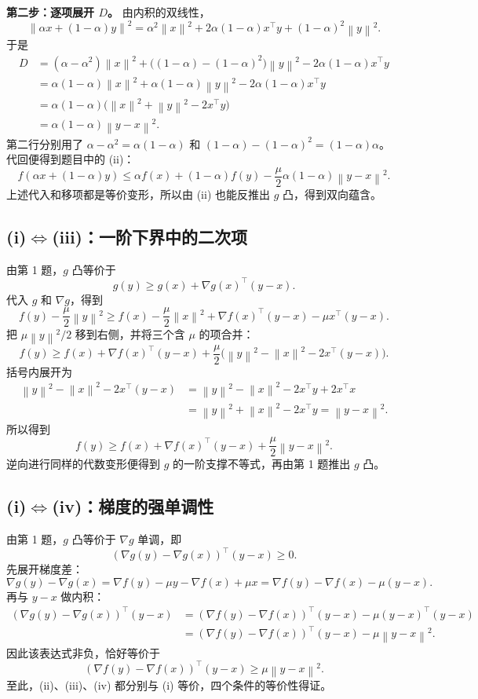 \documentclass[UTF8,a4paper,11pt,fontset=fandol]{ctexart}
\newcommand{\norm}[1]{\left\lVert#1\right\rVert}
\begin{document}
\textbf{第二步：逐项展开 $D$。}
由内积的双线性，
\[
 \norm{\alpha x+(1-\alpha)y}^2
 =\alpha^2\norm x^2+2\alpha(1-\alpha)x^\top y+(1-\alpha)^2\norm y^2.
\]
于是
\begin{align*}
 D&=(\alpha-\alpha^2)\norm x^2
   +\big((1-\alpha)-(1-\alpha)^2\big)\norm y^2
   -2\alpha(1-\alpha)x^\top y\\
 &=\alpha(1-\alpha)\norm x^2
   +\alpha(1-\alpha)\norm y^2-2\alpha(1-\alpha)x^\top y\\
 &=\alpha(1-\alpha)\big(\norm x^2+\norm y^2-2x^\top y\big)\\
 &=\alpha(1-\alpha)\norm{y-x}^2.
\end{align*}
第二行分别用了
$\alpha-\alpha^2=\alpha(1-\alpha)$ 和
$(1-\alpha)-(1-\alpha)^2=(1-\alpha)\alpha$。
代回便得到题目中的 (ii)：
\[
 \boxed{f(\alpha x+(1-\alpha)y)
 \leq\alpha f(x)+(1-\alpha)f(y)
 -\frac\mu2\alpha(1-\alpha)\norm{y-x}^2.}
\]
上述代入和移项都是等价变形，所以由 (ii) 也能反推出 $g$ 凸，得到双向蕴含。

\subsection*{(i)$\Leftrightarrow$(iii)：一阶下界中的二次项}
由第 1 题，$g$ 凸等价于
\[
 g(y)\geq g(x)+\nabla g(x)^\top(y-x).
\]
代入 $g$ 和 $\nabla g$，得到
\[
 f(y)-\frac\mu2\norm y^2
 \geq f(x)-\frac\mu2\norm x^2
 +\nabla f(x)^\top(y-x)-\mu x^\top(y-x).
\]
把 $\mu\norm y^2/2$ 移到右侧，并将三个含 $\mu$ 的项合并：
\[
 f(y)\geq f(x)+\nabla f(x)^\top(y-x)
 +\frac\mu2\big(\norm y^2-\norm x^2-2x^\top(y-x)\big).
\]
括号内展开为
\begin{align*}
 \norm y^2-\norm x^2-2x^\top(y-x)
 &=\norm y^2-\norm x^2-2x^\top y+2x^\top x\\
 &=\norm y^2+\norm x^2-2x^\top y
 =\norm{y-x}^2.
\end{align*}
所以得到
\[
 \boxed{f(y)\geq f(x)+\nabla f(x)^\top(y-x)+\frac\mu2\norm{y-x}^2.}
\]
逆向进行同样的代数变形便得到 $g$ 的一阶支撑不等式，再由第 1 题推出 $g$ 凸。

\subsection*{(i)$\Leftrightarrow$(iv)：梯度的强单调性}
由第 1 题，$g$ 凸等价于 $\nabla g$ 单调，即
\[
 (\nabla g(y)-\nabla g(x))^\top(y-x)\geq0.
\]
先展开梯度差：
\[
 \nabla g(y)-\nabla g(x)
 =\nabla f(y)-\mu y-\nabla f(x)+\mu x
 =\nabla f(y)-\nabla f(x)-\mu(y-x).
\]
再与 $y-x$ 做内积：
\begin{align*}
 (\nabla g(y)-\nabla g(x))^\top(y-x)
 &=(\nabla f(y)-\nabla f(x))^\top(y-x)
   -\mu(y-x)^\top(y-x)\\
 &=(\nabla f(y)-\nabla f(x))^\top(y-x)-\mu\norm{y-x}^2.
\end{align*}
因此该表达式非负，恰好等价于
\[
 \boxed{(\nabla f(y)-\nabla f(x))^\top(y-x)\geq\mu\norm{y-x}^2.}
\]
至此，(ii)、(iii)、(iv) 都分别与 (i) 等价，四个条件的等价性得证。
\end{document}
